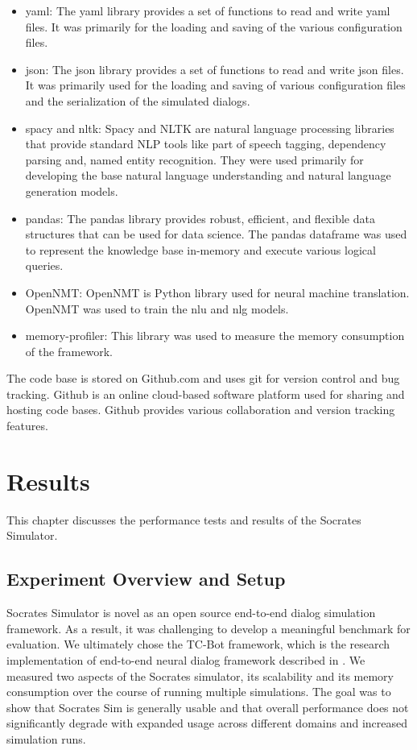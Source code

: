 \begin{itemize}
	\item yaml: The yaml library provides a set of functions to read and write yaml files. It was primarily for the loading and saving of the various configuration files. 
	\item json: The json library provides a set of functions to read and write json files. It was primarily used for the loading and saving of various configuration files and the serialization of the simulated dialogs. 
	\item spacy and nltk: Spacy and NLTK are natural language processing libraries that provide standard NLP tools like part of speech tagging, dependency parsing and, named entity recognition. They were used primarily for developing the base natural language understanding and natural language generation models. 
	\item pandas: The pandas library provides robust, efficient, and flexible data structures that can be used for data science. The pandas dataframe was used to represent the knowledge base in-memory and execute various logical queries.
	\item OpenNMT: OpenNMT is Python library used for neural machine translation. OpenNMT was used to train the nlu and nlg models.
	\item memory-profiler: This library was used to measure the memory consumption of the framework.  
\end{itemize}

The code base is stored on Github.com and uses git for version control and bug tracking. Github is an online cloud-based software platform used for sharing and hosting code bases. Github provides various collaboration and version tracking features.

\chapter{Results}

This chapter discusses the performance tests and results of the Socrates Simulator.

\section{Experiment Overview and Setup}

 Socrates Simulator is novel as an open source end-to-end dialog simulation framework. As a result, it was challenging to develop a meaningful benchmark for evaluation. We ultimately chose the TC-Bot framework, which is the research implementation of end-to-end neural dialog framework described in \cite{li_end_to_end}. We measured two aspects of the Socrates simulator, its scalability and its memory consumption over the course of running multiple simulations. The goal was to show that Socrates Sim is generally usable and that overall performance does not significantly degrade with expanded usage across different domains and increased simulation runs. 
 
